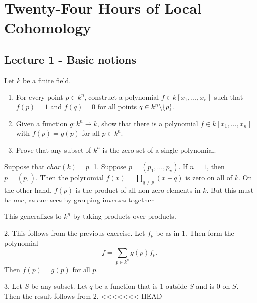 \documentclass[11pt, english]{article}
\begin{document}
\section{Twenty-Four Hours of Local Cohomology}

\subsection{Lecture 1 - Basic notions}

\begin{exc}[Exercise 1.6]
Let $k$ be a finite field.
\begin{enumerate}
\item For every point $p \in k^n$, construct a polynomial $f \in k[x_1,\ldots,x_n]$ such that $f(p)=1$ and $f(q)=0$ for all points $q \in k^n \backslash \{ p \}$.
\item Given a function $g:k^n \to k$, show that there is a polynomial $f \in k[x_1,\ldots,x_n]$ with $f(p)=g(p)$ for all $p \in k^n$.
\item Prove that any subset of $k^n$ is the zero set of a single polynomial. 
\end{enumerate}
\end{exc}

\begin{sol}
Suppose that $char(k)=p$.
1. Suppose $p=(p_1,\ldots,p_n)$. If $n=1$, then $p=(p_1)$. Then the polynomial $f(x)=\prod_{q \neq p}(x-q)$ is zero on all of $k$. On the other hand, $f(p)$ is the product of all non-zero elements in $k$. But this must be one, as one sees by grouping inverses together.

This generalizes to $k^n$ by taking products over products. 

2. This follows from the previous exercise. Let $f_p$ be as in 1. Then form the polynomial 
$$
f = \sum_{p \in k^n} g(p) f_p .
$$
Then $f(p)=g(p)$ for all $p$.

3. Let $S$ be any subset. Let $q$ be a function that is $1$ outside $S$ and is $0$ on $S$. Then the result follows from 2.
<<<<<<< HEAD
\end{sol}
\end{document}
